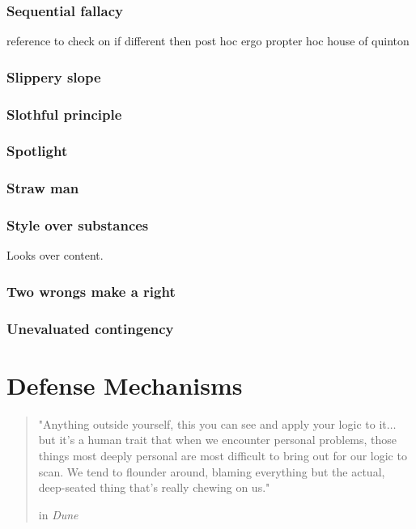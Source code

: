 \subsubsection{Sequential fallacy}
reference to check on if different then post hoc ergo propter hoc house of quinton

\subsubsection{Slippery slope}

\subsubsection{Slothful principle}

\subsubsection{Spotlight}

\subsubsection{Straw man}

\subsubsection{Style over substances}
Looks over content.

\subsubsection{Two wrongs make a right}

\subsubsection{Unevaluated contingency}


\section{Defense Mechanisms}

\begin{quote}
	"Anything outside yourself, this you can see and apply your logic to it$\ldots$ but it's a human trait that when we encounter personal problems, those things most deeply personal are most difficult to bring out for our logic to scan. We tend to flounder around, blaming everything but the actual, deep-seated thing that's really chewing on us."
	\begin{flushright}
		in \emph{Dune}
	\end{flushright}
\end{quote}


